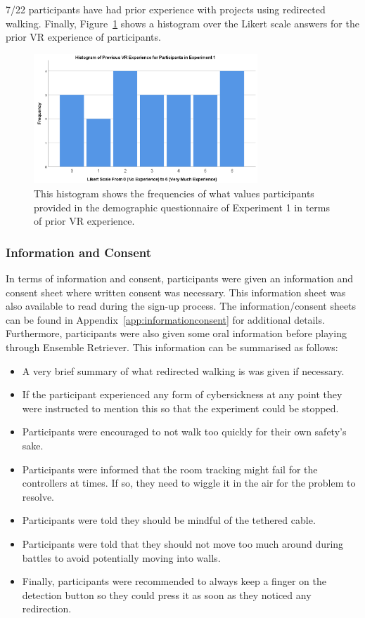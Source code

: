 7/22 participants have had prior experience with projects using redirected walking. Finally, Figure~\ref{fig:ex1PriorVRExperience} shows a histogram over the Likert scale answers for the prior VR experience of participants. 

\begin{figure}[tbph]
    \centering
    \includegraphics[width=0.75\textwidth]{figures/graphs/Experiment1VRExperienceHisto.png}
    \caption[Histogram on Prior VR Experience of Participants in Experiment 1]{This histogram shows the frequencies of what values participants provided in the demographic questionnaire of Experiment 1 in terms of prior VR experience.}
    \label{fig:ex1PriorVRExperience}
\end{figure}

\subsubsection{Information and Consent}
In terms of information and consent, participants were given an information and consent sheet where written consent was necessary. This information sheet was also available to read during the sign-up process. The information/consent sheets can be found in Appendix~\ref{app:informationconsent} for additional details. Furthermore, participants were also given some oral information before playing through Ensemble Retriever. This information can be summarised as follows:

\begin{itemize}
    \item A very brief summary of what redirected walking is was given if necessary.
    \item If the participant experienced any form of cybersickness at any point they were instructed to mention this so that the experiment could be stopped.
    \item Participants were encouraged to not walk too quickly for their own safety's sake.
    \item Participants were informed that the room tracking might fail for the controllers at times. If so, they need to wiggle it in the air for the problem to resolve.
    \item Participants were told they should be mindful of the tethered cable.
    \item Participants were told that they should not move too much around during battles to avoid potentially moving into walls. 
    \item Finally, participants were recommended to always keep a finger on the detection button so they could press it as soon as they noticed any redirection.
\end{itemize}

